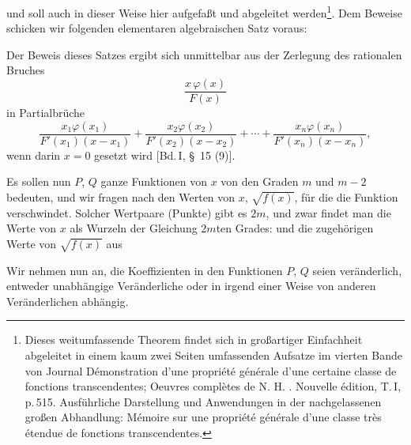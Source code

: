  und soll auch in dieser Weise hier aufgefa\ss t und abgeleitet werden\footnote{Dieses weitumfassende Theorem findet sich in gro\ss artiger Einfachheit abgeleitet in einem kaum zwei Seiten umfassenden Aufsatze im vierten Bande von  Journal \glqq D\'emonstration d'une propri\'et\'e g\'en\'erale d'une certaine classe de fonctions transcendentes\grqq{}; Oeuvres compl\`etes de N. H. . Nouvelle \'edition, T.\,I, p.\,515. Ausf\"uhrliche Darstellung und Anwendungen in der nachgelassenen gro\ss en Abhandlung: \glqq M\'emoire sur une propri\'et\'e g\'en\'erale d'une classe tr\`es \'etendue de fonctions transcendentes\grqq{}.}. Dem Beweise schicken wir folgenden elementaren algebraischen Satz voraus:


Der Beweis dieses Satzes ergibt sich unmittelbar aus der Zerlegung des rationalen Bruches
\[
\frac{x\,\varphi(x)}{F(x)}
\]
in Partialbr\"uche
\[
\frac{x_1\varphi(x_1)}{F'(x_1)(x-x_1)} + \frac{x_2\varphi(x_2)}{F'(x_2)(x-x_2)} + \cdots + \frac{x_n\varphi(x_n)}{F'(x_n)(x-x_n)},
\]
wenn darin $x = 0$ gesetzt wird [Bd.\,I, \S\ 15 (9)].

Es sollen nun $P$, $Q$ ganze Funktionen von $x$ von den Graden $m$ und $m-2$ bedeuten, und wir fragen nach den Werten von $x$, $\sqrt{f(x)}$, f\"ur die die Funktion
verschwindet. Solcher Wertpaare (Punkte) gibt es $2m$, und zwar findet man die Werte von $x$ als Wurzeln der Gleichung $2m$ten Grades:
und die zugeh\"origen Werte von $\sqrt{f(x)}$ aus

Wir nehmen nun an, die Koeffizienten in den Funktionen $P$, $Q$ seien ver\"anderlich, entweder unabh\"angige Ver\"anderliche oder in irgend einer Weise von anderen Ver\"anderlichen abh\"angig.
